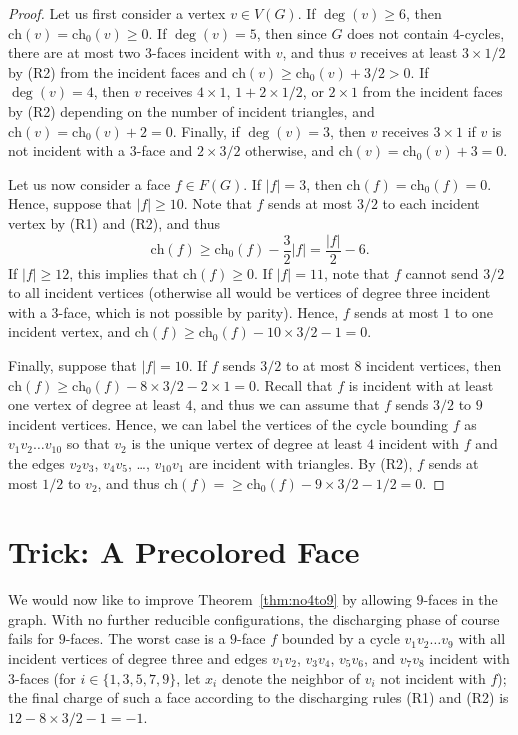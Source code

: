 \documentclass[12pt,twoside,openright,a4paper]{book}
\newcommand{\initch}{\text{ch}_0}
\newcommand{\finch}{\text{ch}}
\begin{document}
\begin{proof}
Let us first consider a vertex $v\in V(G)$.  If $\deg(v)\ge 6$, then $\finch(v)=\initch(v)\ge 0$.
If $\deg(v)=5$, then since $G$ does not contain $4$-cycles, there are at most two $3$-faces incident with $v$, and
thus $v$ receives at least $3\times 1/2$ by (R2) from the incident faces and $\finch(v)\ge \initch(v)+3/2>0$.
If $\deg(v)=4$, then $v$ receives $4\times 1$, $1+2\times 1/2$, or $2\times 1$ from the incident faces by (R2)
depending on the number of incident triangles, and $\finch(v)=\initch(v)+2=0$.  Finally, if $\deg(v)=3$, then $v$ receives
$3\times 1$ if $v$ is not incident with a $3$-face and $2\times 3/2$ otherwise, and $\finch(v)=\initch(v)+3=0$.

Let us now consider a face $f\in F(G)$.  If $|f|=3$, then $\finch(f)=\initch(f)=0$.  Hence, suppose that $|f|\ge 10$.
Note that $f$ sends at most $3/2$ to each incident vertex by (R1) and (R2), and thus
$$\finch(f)\ge \initch(f)-\frac{3}{2}|f|=\frac{|f|}{2}-6.$$
If $|f|\ge 12$, this implies that $\finch(f)\ge 0$.  If $|f|=11$, note that $f$ cannot send $3/2$ to all incident
vertices (otherwise all would be vertices of degree three incident with a $3$-face, which is not possible by parity).
Hence, $f$ sends at most $1$ to one incident vertex, and $\finch(f)\ge \initch(f)-10\times 3/2-1=0$.

Finally, suppose that $|f|=10$.  If $f$ sends $3/2$ to at most $8$ incident vertices, then
$\finch(f)\ge\initch(f)-8\times 3/2-2\times 1=0$. Recall that $f$ is incident with at least
one vertex of degree at least $4$, and thus we can assume that $f$ sends $3/2$ to $9$ incident
vertices.  Hence, we can label the vertices of the cycle bounding $f$ as $v_1v_2\ldots v_{10}$
so that $v_2$ is the unique vertex of degree at least $4$ incident with $f$ and the edges $v_2v_3$, $v_4v_5$,
\ldots, $v_{10}v_1$ are incident with triangles.  By (R2), $f$ sends at most $1/2$ to $v_2$, and thus
$\finch(f)=\ge\initch(f)-9\times 3/2-1/2=0$.
\end{proof}

\section{Trick: A Precolored Face}\label{sec:precolface}

We would now like to improve Theorem~\ref{thm:no4to9} by allowing $9$-faces in the graph.
With no further reducible configurations, the discharging phase of course fails for $9$-faces.
The worst case is a $9$-face $f$ bounded by a cycle $v_1v_2\ldots v_9$ with all
incident vertices of degree three and edges $v_1v_2$, $v_3v_4$, $v_5v_6$, and $v_7v_8$
incident with $3$-faces (for $i\in \{1,3,5,7,9\}$, let $x_i$ denote the neighbor of $v_i$
not incident with $f$); the final charge of such a face according to the discharging rules
(R1) and (R2) is $12-8\times 3/2-1=-1$.
\end{document}
